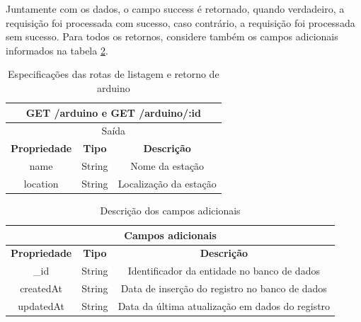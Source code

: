 Juntamente com os dados, o campo success é retornado, quando verdadeiro, a requisição foi processada com sucesso, caso contrário, a requisição foi processada sem sucesso. Para todos os retornos, considere também os campos adicionais informados na tabela \ref{table:campos_adicionais}.

\begin{table}[H]
    \centering
    \caption{Especificações das rotas de listagem e retorno de arduino \label{table:get_arduino}}
    \begin{tabular}{c|c|c}
    \hline
    \multicolumn{3}{c}{\textbf{GET /arduino e GET /arduino/:id}} \\ \hline
    \multicolumn{3}{c}{Saída}                                                          \\ \hline
    \textbf{Propriedade}         & \textbf{Tipo}         & \textbf{Descrição}            \\  \hline
    name                         & String                & Nome da estação               \\  \hline
    location                     & String                & Localização da estação \\

    \hline
    \end{tabular}
\end{table}

\begin{table}[H]
    \centering
    \caption{Descrição dos campos adicionais \label{table:campos_adicionais}}
    \begin{tabular}{c|c|c}
    \hline
    \multicolumn{3}{c}{\textbf{Campos adicionais}} \\ \hline
    \textbf{Propriedade}         & \textbf{Tipo}         & \textbf{Descrição}            \\  \hline
    \_id                         & String                & Identificador da entidade no banco de dados      \\  \hline
    createdAt                    & String                & Data de inserção do registro no banco de dados         \\ \hline
    updatedAt                    & String                & Data da última atualização em dados do registro         \\ \hline
    \end{tabular}
\end{table}

